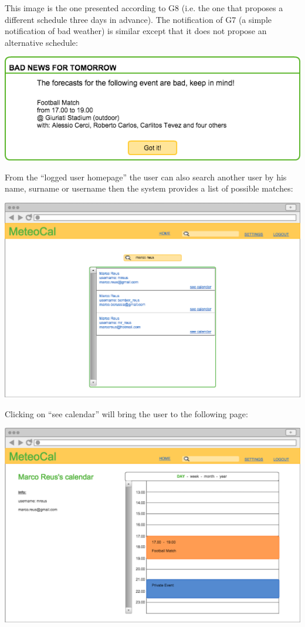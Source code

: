 \documentclass[10pt,a4paper,titlepage]{article}
\begin{document}
This image is the one presented according to G8 (i.e. the one that proposes a different schedule three days in advance). The notification of G7 (a simple notification of bad weather) is similar except that it does not propose an alternative schedule:

\vspace{3mm}\includegraphics[width={\linewidth}]{./UI_mockups/11-bad_weather_one_day}\vspace{3mm}

From the “logged user homepage” the user can also search another user by his name, surname or username then the system provides a list of possible matches:

\vspace{3mm}\includegraphics[width={\linewidth}]{./UI_mockups/08-search.png}\vspace{3mm}

Clicking on “see calendar” will bring the user to the following page:

\vspace{3mm}\includegraphics[width={\linewidth}]{./UI_mockups/09-other_calendar.png}\vspace{3mm}
\end{document}
